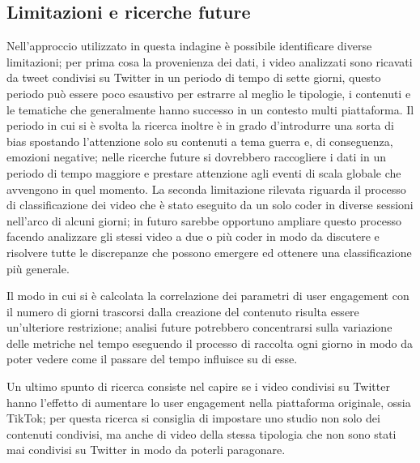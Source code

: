 \subsection{Limitazioni e ricerche future}

Nell'approccio utilizzato in questa indagine è possibile identificare diverse limitazioni; per prima cosa la provenienza dei dati, 
i video analizzati sono ricavati da tweet condivisi su Twitter in un periodo di tempo di sette giorni, questo periodo può essere poco 
esaustivo per estrarre al meglio le tipologie, i contenuti e le tematiche che generalmente hanno successo in un contesto multi piattaforma. 
Il periodo in cui si è svolta la ricerca inoltre è in grado d'introdurre una sorta di bias spostando l'attenzione solo su contenuti a 
tema guerra e, di conseguenza, emozioni negative; nelle ricerche future si dovrebbero raccogliere i dati in un periodo di tempo maggiore e 
prestare attenzione agli eventi di scala globale che avvengono in quel momento. 
La seconda limitazione rilevata riguarda il processo di classificazione dei video che è stato eseguito da un solo coder in diverse sessioni 
nell'arco di alcuni giorni; in futuro sarebbe opportuno ampliare questo processo facendo analizzare gli stessi video a due o più coder 
in modo da discutere e risolvere tutte le discrepanze che possono emergere ed ottenere una classificazione più generale.

Il modo in cui si è calcolata la correlazione dei parametri di user engagement con il numero di giorni trascorsi dalla creazione del 
contenuto risulta essere un'ulteriore restrizione; analisi future potrebbero concentrarsi sulla variazione delle metriche nel tempo eseguendo 
il processo di raccolta ogni giorno in modo da poter vedere come il passare del tempo influisce su di esse.

Un ultimo spunto di ricerca consiste nel capire se i video condivisi su Twitter hanno l'effetto di aumentare lo user engagement nella 
piattaforma originale, ossia TikTok; per questa ricerca si consiglia di impostare uno studio non solo dei contenuti condivisi, ma anche 
di video della stessa tipologia che non sono stati mai condivisi su Twitter in modo da poterli paragonare.